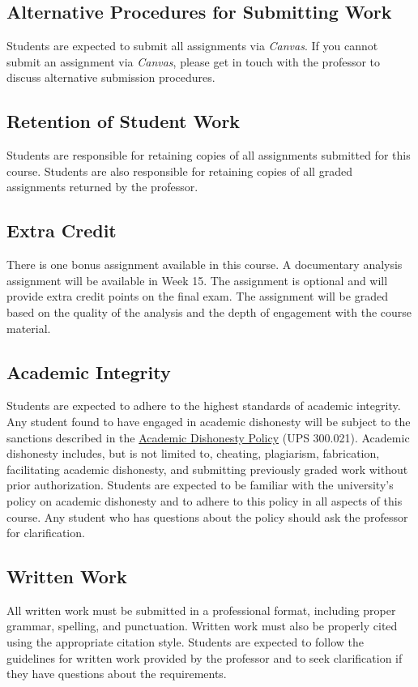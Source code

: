 \documentclass[12pt, letterpaper]{article}
\begin{document}
\subsection*{Alternative Procedures for Submitting Work}
Students are expected to submit all assignments via \emph{Canvas}. If you cannot submit an assignment via \emph{Canvas}, please get in touch with the professor to discuss alternative submission procedures.

\subsection*{Retention of Student Work}
Students are responsible for retaining copies of all assignments submitted for this course. Students are also responsible for retaining copies of all graded assignments returned by the professor.

\subsection*{Extra Credit}
 There is one bonus assignment available in this course. A documentary analysis assignment will be available in Week 15. The assignment is optional and will provide extra credit points on the final exam. The assignment will be graded based on the quality of the analysis and the depth of engagement with the course material.

\subsection*{Academic Integrity}
Students are expected to adhere to the highest standards of academic integrity. Any student found to have engaged in academic dishonesty will be subject to the sanctions described in the \href{https://www.fullerton.edu/senate/publications_policies_resolutions/ups/UPS%20300/UPS%20300.021.pdf}{Academic Dishonesty Policy} (UPS 300.021). Academic dishonesty includes, but is not limited to, cheating, plagiarism, fabrication, facilitating academic dishonesty, and submitting previously graded work without prior authorization. Students are expected to be familiar with the university's policy on academic dishonesty and to adhere to this policy in all aspects of this course. Any student who has questions about the policy should ask the professor for clarification.

\subsection*{Written Work}
All written work must be submitted in a professional format, including proper grammar, spelling, and punctuation. Written work must also be properly cited using the appropriate citation style. Students are expected to follow the guidelines for written work provided by the professor and to seek clarification if they have questions about the requirements.
\end{document}
